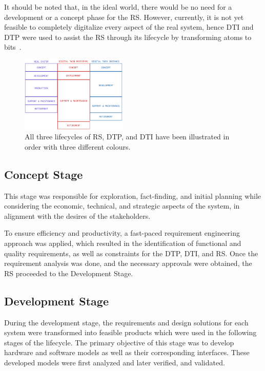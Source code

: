 \documentclass[conference]{IEEEtran}
\begin{document}
    It should be noted that, in the ideal world, there would be no need for a development or a concept phase 
    for the RS. However, currently, it is not yet feasible to completely digitalize every aspect of the real system, 
    hence DTI and DTP were used to assist the RS through its lifecycle by transforming atoms to bits~\cite{BeingDigital}.

    \begin{figure}[htbp]
        \centering
        \includegraphics[width=0.45\textwidth]{LIFECYCLE.png}
        \caption{All three lifecycles of RS, DTP, and DTI have been illustrated in order with three different colours.}\label{fig:LIFECYCLE}
    \end{figure}
    
    \subsection{Concept Stage}
    This stage was responsible for exploration, fact-finding, and initial planning while considering the economic, technical, and strategic aspects of the system, in alignment with the desires of the stakeholders. 
    
    To ensure efficiency and productivity, a fast-paced requirement engineering approach was applied, which resulted in the identification of functional and quality requirements, 
    as well as constraints for the DTP, DTI, and RS. Once the requirement analysis was done, and the necessary approvals were obtained, the RS proceeded to the Development Stage. 
    
    \subsection{Development Stage}
    During the development stage, the requirements and design solutions for each system were transformed into feasible products which were used in the following stages of the lifecycle.
    The primary objective of this stage was to develop hardware and software models as well as their corresponding interfaces. 
    These developed models were first analyzed and later verified, and validated. 
\end{document}

